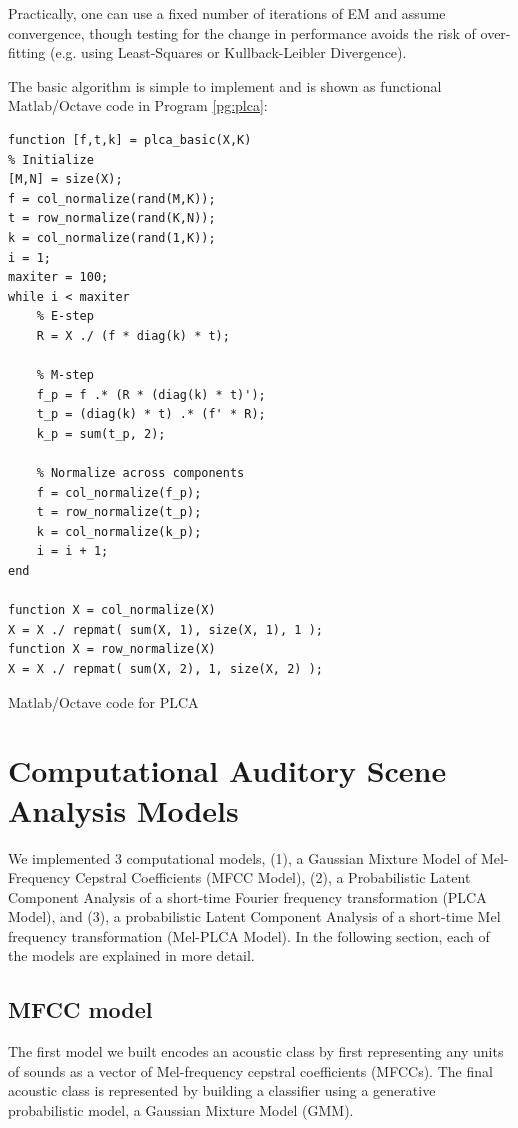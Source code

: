 \documentclass[a4paper,10pt,final]{ThesisStyle}
\begin{document}
Practically, one can use a fixed number of iterations of EM and assume convergence, though testing for the change in performance avoids the risk of over-fitting \cite{Hofmann1999} (e.g. using Least-Squares or Kullback-Leibler Divergence).   

The basic algorithm is simple to implement and is shown as functional Matlab/Octave code in Program \ref{pg:plca}: 


\begin{program}
  \begin{verbatim}
function [f,t,k] = plca_basic(X,K)
% Initialize
[M,N] = size(X);
f = col_normalize(rand(M,K));
t = row_normalize(rand(K,N));
k = col_normalize(rand(1,K));
i = 1;
maxiter = 100;
while i < maxiter
    % E-step
    R = X ./ (f * diag(k) * t);
    
    % M-step
    f_p = f .* (R * (diag(k) * t)');
    t_p = (diag(k) * t) .* (f' * R);
    k_p = sum(t_p, 2);
    
    % Normalize across components
    f = col_normalize(f_p);
    t = row_normalize(t_p);
    k = col_normalize(k_p);
    i = i + 1;
end

function X = col_normalize(X)
X = X ./ repmat( sum(X, 1), size(X, 1), 1 );
function X = row_normalize(X)
X = X ./ repmat( sum(X, 2), 1, size(X, 2) );
\end{verbatim}
  \caption{Matlab/Octave code for PLCA}
\label{pg:plca}
\end{program}


\section{Computational Auditory Scene Analysis Models}

We implemented 3 computational models, (1), a Gaussian Mixture Model of Mel-Frequency Cepstral Coefficients (MFCC Model), (2), a Probabilistic Latent Component Analysis of a short-time Fourier frequency transformation (PLCA Model), and (3), a probabilistic Latent Component Analysis of a short-time Mel frequency transformation (Mel-PLCA Model).  In the following section, each of the models are explained in more detail.

\subsection{MFCC model}
The first model we built encodes an acoustic class by first representing any units of sounds as a vector of Mel-frequency cepstral coefficients (MFCCs).  The final acoustic class is represented by building a classifier using a generative probabilistic model, a Gaussian Mixture Model (GMM).  
\end{document}
